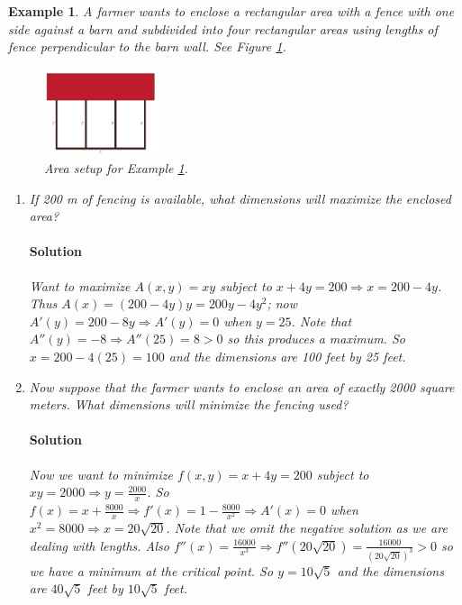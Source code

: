 \documentclass[letterpaper, 11pt, openany]{book}
\theoremstyle{mytheoremstyle}
\theoremstyle{myexamplestyle}
\newtheorem{example}{Example}[section]
\newenvironment{solution}{\paragraph{\sffamily \smaller \fontseries{b}\selectfont Solution}}{\hfill\faSquare}
\begin{document}
\begin{example}\label{e:optimize-fence}
    A farmer wants to enclose a rectangular area with a fence with one side against a barn and subdivided into four rectangular areas using lengths of fence perpendicular to the barn wall. See Figure \ref{f:optimize-fence}.
    \begin{figure}[htbp]
        \centering
            \includegraphics[width=0.3\textwidth]{Figures/opt-barn.pdf}
        \caption{Area setup for Example \ref{e:optimize-fence}.}
        \label{f:optimize-fence}
    \end{figure}
    \begin{enumerate}%
        \item If 200 m of fencing is available, what dimensions will maximize the enclosed area?
        \begin{solution}
            Want to maximize \(A(x,y) = xy\) subject to \(x + 4y = 200 \Rightarrow x = 200-4y\). Thus \(A(x) = (200-4y)y = 200y - 4y^{2}\); now \(A'(y) = 200 - 8y \Rightarrow A'(y) = 0\) when \(y = 25\). Note that \(A''(y) = -8 \Rightarrow A''(25) = 8 >0\) so this produces a maximum. So \(x = 200-4(25) = 100\) and the dimensions are 100 feet by 25 feet.
        \end{solution}
        \item Now suppose that the farmer wants to enclose an area of exactly 2000 square meters. What dimensions will minimize the fencing used?
        \begin{solution}
            Now we want to minimize \(f(x,y) = x + 4y = 200\) subject to \(xy = 2000 \Rightarrow y = \frac{2000}{x}\). So \(f(x) = x + \frac{8000}{x} \Rightarrow f'(x) = 1 - \frac{8000}{x^{2}} \Rightarrow A'(x) = 0\) when \(x^{2} = 8000 \Rightarrow x = 20\sqrt{20}\). Note that we omit the negative solution as we are dealing with lengths. Also \(f''(x) = \frac{16000}{x^{3}} \Rightarrow f''(20\sqrt{20}) = \frac{16000}{(20\sqrt{20})^{3}}> 0\) so we have a minimum at the critical point. So \(y = 10\sqrt{5}\) and the dimensions are \(40\sqrt{5}\) feet by \(10\sqrt{5}\) feet.
        \end{solution}
    \end{enumerate}
\end{example}
\end{document}
